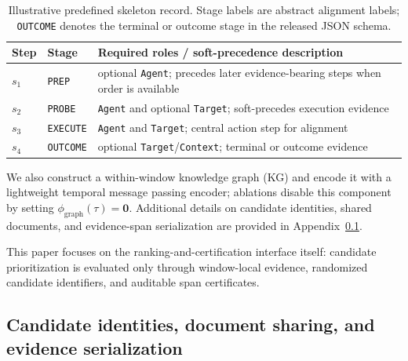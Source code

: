 \documentclass{article}
\begin{document}
\begin{table}[t]
\centering
\caption{Illustrative predefined skeleton record. Stage labels are abstract alignment labels; \texttt{OUTCOME} denotes the terminal or outcome stage in the released JSON schema.}
\label{tab:skeleton_example}
\small
\setlength{\tabcolsep}{4pt}
\begin{tabularx}{\linewidth}{l l Y}
\hline
Step & Stage & Required roles / soft-precedence description \\
\hline
$s_1$ & \texttt{PREP} & optional \texttt{Agent}; precedes later evidence-bearing steps when order is available \\
$s_2$ & \texttt{PROBE} & \texttt{Agent} and optional \texttt{Target}; soft-precedes execution evidence \\
$s_3$ & \texttt{EXECUTE} & \texttt{Agent} and \texttt{Target}; central action step for alignment \\
$s_4$ & \texttt{OUTCOME} & optional \texttt{Target}/\texttt{Context}; terminal or outcome evidence \\
\hline
\end{tabularx}
\end{table}

We also construct a within-window knowledge graph (KG) and encode it with a lightweight temporal message passing encoder; ablations disable this component by setting $\phi_{\text{graph}}(\tau)=\mathbf{0}$.
Additional details on candidate identities, shared documents, and evidence-span serialization are provided in Appendix~\ref{sec:app_moved_candidate_identity}.

This paper focuses on the ranking-and-certification interface itself: candidate prioritization is evaluated only through window-local evidence, randomized candidate identifiers, and auditable span certificates.

\subsection{Candidate identities, document sharing, and evidence serialization}
\label{sec:app_moved_candidate_identity}
\end{document}
